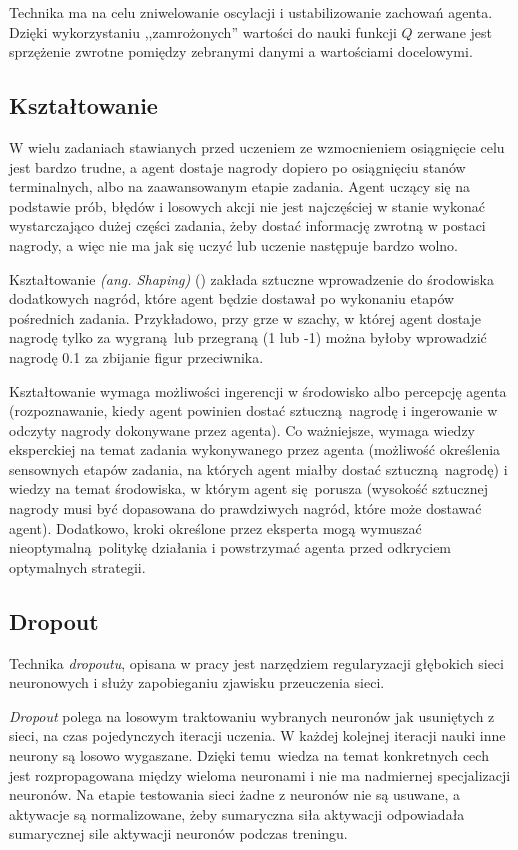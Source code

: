 Technika ma na celu zniwelowanie oscylacji i ustabilizowanie zachowań agenta. Dzięki wykorzystaniu ,,zamrożonych'' wartości do nauki funkcji $Q$ zerwane jest sprzężenie zwrotne pomiędzy zebranymi danymi a wartościami docelowymi.

\subsection{Kształtowanie}\label{shaping}
W wielu zadaniach stawianych przed uczeniem ze wzmocnieniem osiągnięcie celu jest bardzo trudne, a agent dostaje nagrody dopiero po osiągnięciu stanów terminalnych, albo na zaawansowanym etapie zadania. Agent uczący się na podstawie prób, błędów i losowych akcji nie jest najczęściej w stanie wykonać wystarczająco dużej części zadania, żeby dostać informację zwrotną w postaci nagrody, a więc nie ma jak się uczyć lub uczenie następuje bardzo wolno.

Kształtowanie \textit{(ang. Shaping)} (\cite{Mataric94rewardfunctions}) zakłada sztuczne wprowadzenie do środowiska dodatkowych nagród, które agent będzie dostawał po wykonaniu etapów pośrednich zadania. Przykładowo, przy grze w szachy, w której agent dostaje nagrodę tylko za wygraną lub przegraną (1 lub -1) można byłoby wprowadzić nagrodę 0.1 za zbijanie figur przeciwnika.

Kształtowanie wymaga możliwości ingerencji w środowisko albo percepcję agenta (rozpoznawanie, kiedy agent powinien dostać sztuczną nagrodę i ingerowanie w odczyty nagrody dokonywane przez agenta). Co ważniejsze, wymaga wiedzy eksperckiej na temat zadania wykonywanego przez agenta (możliwość określenia sensownych etapów zadania, na których agent miałby dostać sztuczną nagrodę) i wiedzy na temat środowiska, w którym agent się porusza (wysokość sztucznej nagrody musi być dopasowana do prawdziwych nagród, które może dostawać agent). Dodatkowo, kroki określone przez eksperta mogą wymuszać nieoptymalną politykę działania i powstrzymać agenta przed odkryciem optymalnych strategii.

\subsection{Dropout}\label{dropout}

Technika \textit{dropoutu}, opisana w pracy \cite{Srivastava:2014:DSW:2627435.2670313} jest narzędziem regularyzacji głębokich sieci neuronowych i służy zapobieganiu zjawisku przeuczenia sieci.

\textit{Dropout} polega na losowym traktowaniu wybranych neuronów jak usuniętych z sieci, na czas pojedynczych iteracji uczenia. W każdej kolejnej iteracji nauki inne neurony są losowo wygaszane. Dzięki temu wiedza na temat konkretnych cech jest rozpropagowana między wieloma neuronami i nie ma nadmiernej specjalizacji neuronów. Na etapie testowania sieci żadne z neuronów nie są usuwane, a aktywacje są normalizowane, żeby sumaryczna siła aktywacji odpowiadała sumarycznej sile aktywacji neuronów podczas treningu.

